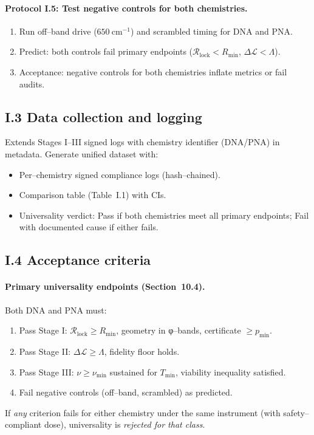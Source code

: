 \documentclass[11pt]{article}
\begin{document}
\paragraph{Protocol I.5: Test negative controls for both chemistries.}
\begin{enumerate}
\item Run off–band drive ($650~\mathrm{cm^{-1}}$) and scrambled timing for DNA and PNA.
\item Predict: both controls fail primary endpoints ($\mathcal{R}_{\mathrm{lock}}<R_{\min}$, $\Delta\mathcal{L}<\Lambda$).
\item Acceptance: negative controls for both chemistries inflate metrics or fail audits.
\end{enumerate}

\subsection*{I.3 Data collection and logging}

Extends Stages I–III signed logs with chemistry identifier (DNA/PNA) in metadata. Generate unified dataset with:
\begin{itemize}
\item Per–chemistry signed compliance logs (hash–chained).
\item Comparison table (Table~I.1) with CIs.
\item Universality verdict: \textsf{Pass} if both chemistries meet all primary endpoints; \textsf{Fail} with documented cause if either fails.
\end{itemize}

\subsection*{I.4 Acceptance criteria}

\paragraph{Primary universality endpoints (Section~10.4).}
Both DNA and PNA must:
\begin{enumerate}
\item Pass Stage I: $\mathcal{R}_{\mathrm{lock}}\ge R_{\min}$, geometry in φ–bands, certificate $\ge p_{\min}$.
\item Pass Stage II: $\Delta\mathcal{L}\ge\Lambda$, fidelity floor holds.
\item Pass Stage III: $\nu\ge\nu_{\min}$ sustained for $T_{\min}$, viability inequality satisfied.
\item Fail negative controls (off–band, scrambled) as predicted.
\end{enumerate}
If \emph{any} criterion fails for either chemistry under the same instrument (with safety–compliant dose), universality is \emph{rejected for that class}.
\end{document}
